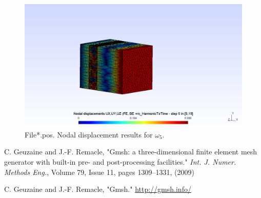 \documentclass[a4]{article}
\begin{document}
\begin{figure}[h!]
	\centering
	\includegraphics[scale = 0.5]{u_w5.png}
	\caption{File*.pos. Nodal displacement results for $\omega_5$.}
	\label{fig:u_w5}
\end{figure}

\begin{thebibliography}{99}
	
	 C. Geuzaine and J.-F. Remacle, "Gmsh: a three-dimensional finite element mesh generator with built-in pre- and post-processing facilities." \emph{Int. J. Numer. Methods Eng.}, Volume 79, Issue 11, pages 1309--1331, (2009)
	
	  C. Geuzaine and J.-F. Remacle, "Gmsh." \url{http://gmsh.info/}
	
\end{thebibliography}
\end{document}
